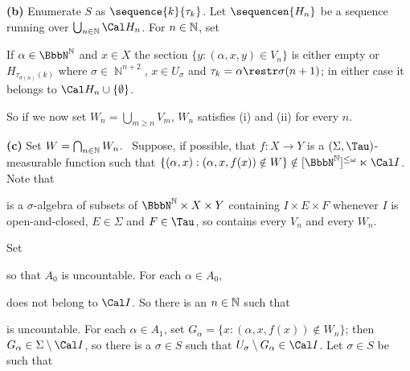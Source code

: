 {\medskip

{\bf (b)} Enumerate $S$ as $\sequence{k}{\tau_k}$.   Let
$\sequencen{H_n}$ be a sequence running over
$\bigcup_{n\in\Bbb N}\Cal H_n$.   For $n\in\Bbb N$, set



\noindent  If $\alpha\in\NN$ and $x\in X$ the section
$\{y:(\alpha,x,y)\in V_n\}$ is either empty or
$H_{\tau_{\sigma(n)}(k)}$ where $\sigma\in\BbbN^{n+2}$,
$x\in U_{\sigma}$ and $\tau_k=\alpha\restr\sigma(n+1)$;
in either case it belongs to $\Cal H_n\cup\{\emptyset\}$.

So if we now set
$W_n=\bigcup_{m\ge n}V_m$, $W_n$ satisfies (i) and (ii) for every $n$.

\medskip

{\bf (c)} Set $W=\bigcap_{n\in\Bbb N}W_n$.   \Quer\ Suppose, if
possible, that $f:X\to Y$ is a
$(\Sigma,\Tau)$-measurable function such that
$\{(\alpha,x):(\alpha,x,f(x))\notin W\}
  \notin[\NN]^{\le\omega}\ltimes\Cal I$.   Note that


\noindent is a $\sigma$-algebra of subsets of $\NN\times X\times Y$
containing $I\times E\times F$ whenever $I$ is open-and-closed,
$E\in\Sigma$ and $F\in\Tau$, so
contains every $V_n$ and every $W_n$.

Set


\noindent so that $A_0$ is uncountable.   For each $\alpha\in A_0$,


\noindent does not belong to $\Cal I$.   So there is an $n\in\Bbb N$
such that


\noindent is uncountable.   For each $\alpha\in A_1$, set
$G_{\alpha}=\{x:(\alpha,x,f(x))\notin W_n\}$;  then
$G_{\alpha}\in\Sigma\setminus\Cal I$, so there is a $\sigma\in S$ such
that
$U_{\sigma}\setminus G_{\alpha}\in\Cal I$.   Let $\sigma\in S$ be such
that

}
